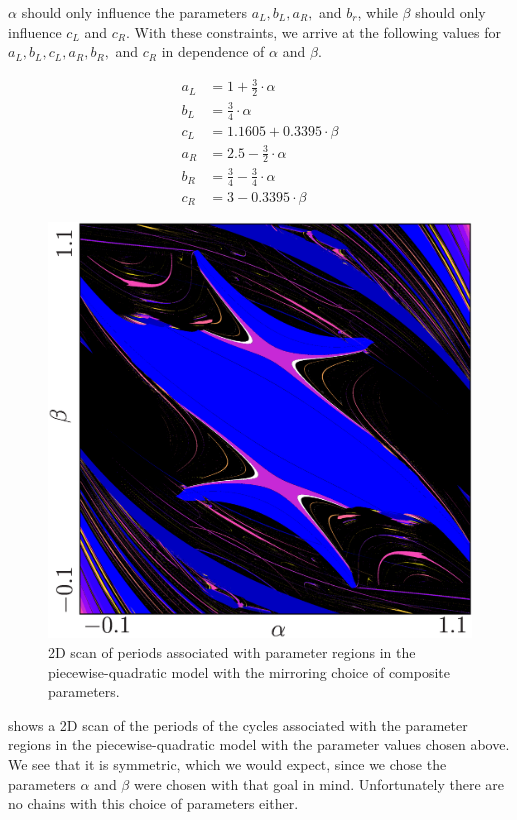 $\alpha$ should only influence the parameters $a_L, b_L, a_R,$ and $b_r$, while $\beta$ should only influence $c_L$ and $c_R$.
With these constraints, we arrive at the following values for $a_L, b_L, c_L, a_R, b_R,$ and $c_R$ in dependence of $\alpha$ and $\beta$.

\begin{subequations}
	\begin{align}
		a_L & = 1 + \frac{3}{2} \cdot \alpha           \\
		b_L & = \frac{3}{4} \cdot \alpha               \\
		c_L & = 1.1605 + 0.3395 \cdot \beta            \\
		a_R & = 2.5 - \frac{3}{2} \cdot \alpha         \\
		b_R & = \frac{3}{4} - \frac{3}{4} \cdot \alpha \\
		c_R & = 3 - 0.3395 \cdot \beta
	\end{align}
\end{subequations}

\begin{figure}
	\centering
	\includegraphics[width=.7 \textwidth]{../Figures/A/A.6/result.png}
	\caption[2D scan of periods associated with parameter regions in the piecewise-quadratic model with the mirroring choice of composite parameters]{
		2D scan of periods associated with parameter regions in the piecewise-quadratic model with the mirroring choice of composite parameters.
	}
	\label{fig:app.model.quad.mirrored}
\end{figure}

 shows a 2D scan of the periods of the cycles associated with the parameter regions in the piecewise-quadratic model with the parameter values chosen above.
We see that it is symmetric, which we would expect, since we chose the parameters $\alpha$ and $\beta$ were chosen with that goal in mind.
Unfortunately there are no chains with this choice of parameters either.
